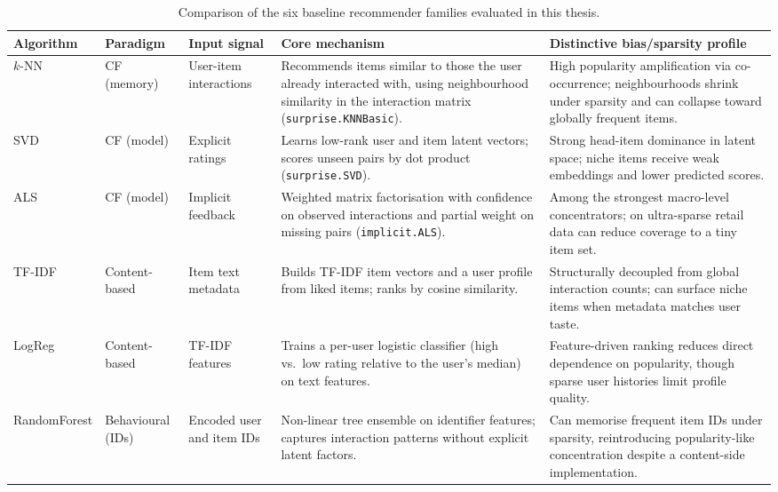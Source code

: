 \documentclass[11pt,a4paper]{report}
\begin{document}
\begin{table}[H]
  \centering
  \caption{Comparison of the six baseline recommender families evaluated in this thesis.}
  \label{tab:baseline_comparison}
  \footnotesize
  \setlength{\tabcolsep}{4pt}
  \renewcommand{\arraystretch}{1.18}
  \begin{tabularx}{\textwidth}{@{}L{0.12\textwidth}L{0.12\textwidth}L{0.12\textwidth}X L{0.20\textwidth}@{}}
    \toprule
    \textbf{Algorithm} & \textbf{Paradigm} & \textbf{Input signal} & \textbf{Core mechanism} & \textbf{Distinctive bias/sparsity profile} \\
    \midrule
    $k$-NN & CF (memory) & User-item interactions & Recommends items similar to those the user already interacted with, using neighbourhood similarity in the interaction matrix (\texttt{surprise.KNNBasic}). & High popularity amplification via co-occurrence; neighbourhoods shrink under sparsity and can collapse toward globally frequent items. \\
    SVD & CF (model) & Explicit ratings & Learns low-rank user and item latent vectors; scores unseen pairs by dot product (\texttt{surprise.SVD}). & Strong head-item dominance in latent space; niche items receive weak embeddings and lower predicted scores. \\
    ALS & CF (model) & Implicit feedback & Weighted matrix factorisation with confidence on observed interactions and partial weight on missing pairs (\texttt{implicit.ALS}). & Among the strongest macro-level concentrators; on ultra-sparse retail data can reduce coverage to a tiny item set. \\
    TF-IDF & Content-based & Item text metadata & Builds TF-IDF item vectors and a user profile from liked items; ranks by cosine similarity. & Structurally decoupled from global interaction counts; can surface niche items when metadata matches user taste. \\
    LogReg & Content-based & TF-IDF features & Trains a per-user logistic classifier (high vs.\ low rating relative to the user's median) on text features. & Feature-driven ranking reduces direct dependence on popularity, though sparse user histories limit profile quality. \\
    RandomForest & Behavioural (IDs) & Encoded user and item IDs & Non-linear tree ensemble on identifier features; captures interaction patterns without explicit latent factors. & Can memorise frequent item IDs under sparsity, reintroducing popularity-like concentration despite a content-side implementation. \\
    \bottomrule
  \end{tabularx}
\end{table}
\FloatBarrier
\end{document}
